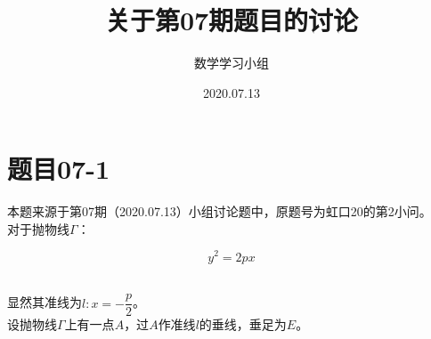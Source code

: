 \documentclass[UTF8]{ctexart}
\title{关于第07期题目的讨论}
\author{数学学习小组}
\date{2020.07.13}
\begin{document}
\maketitle

\newpage

\tableofcontents

\newpage

\setlength{\parindent}{0pt}
\setlength{\columnseprule}{0.4pt}
\setlength{\columnsep}{40pt}

\section{题目07-1}
    本题来源于第07期（2020.07.13）小组讨论题中，原题号为虹口20的第2小问。\\[3mm]
    对于抛物线$\Gamma$：
    \begin{large}
        \begin{equation*}
            y^2=2px
        \end{equation*}
    \end{large}\\
    显然其准线为$l:x=-\dfrac{p}{2}$。\\[3mm]
    设抛物线$\Gamma$上有一点$A$，过$A$作准线$l$的垂线，垂足为$E$。\\[3mm]
\end{document}

